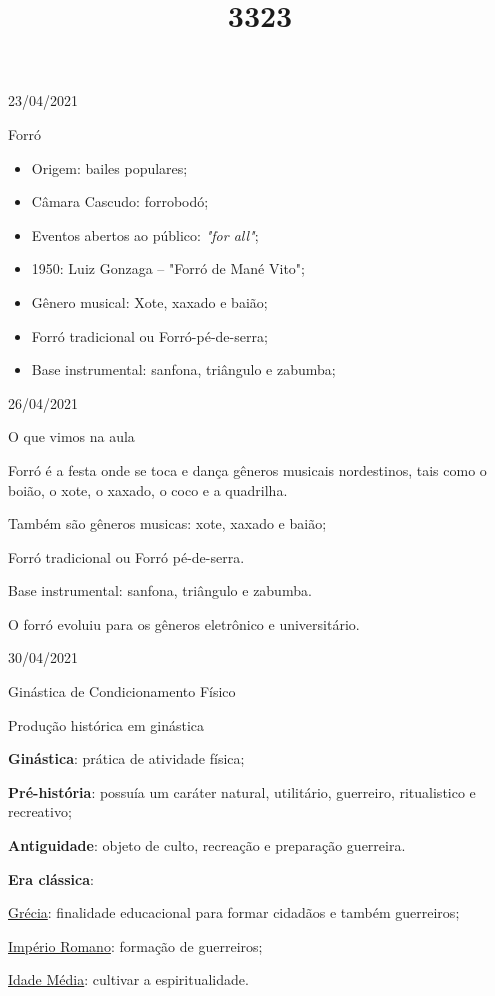 \documentclass{SchoolBook}
\begin{document}
    \begin{day}{23/04/2021}
        \title{3}{Forró}
        
        \begin{itemize}[nosep]
            \item Origem: bailes populares;
            \item Câmara Cascudo: forrobodó;
            \item Eventos abertos ao público: \emph{"for all"};
            \item 1950: Luiz Gonzaga -- "Forró de Mané Vito";
            \vspace{3pt}
            \item Gênero musical: Xote, xaxado e baião;
            \item Forró tradicional ou Forró-pé-de-serra;
            \item Base instrumental: sanfona, triângulo e zabumba;
        \end{itemize}
    \end{day}
    
    \begin{day}{26/04/2021}
        \title{3}{O que vimos na aula}
    
        Forró é a festa onde se toca e dança gêneros musicais nordestinos, tais como o boião, o xote, o xaxado, o coco e a quadrilha.
        
        Também são gêneros musicas: xote, xaxado e baião;
        
        Forró tradicional ou Forró pé-de-serra.
        
        Base instrumental: sanfona, triângulo e zabumba.
        
        O forró evoluiu para os gêneros eletrônico e universitário.
    \end{day}
    
    \begin{day}{30/04/2021}
        \title{2}{Ginástica de Condicionamento Físico}
        \title{3}{Produção histórica em ginástica}
        
        \textbf{Ginástica}: prática de atividade física;
        
        \textbf{Pré-história}: possuía um caráter natural, utilitário, guerreiro, ritualistico e recreativo;
        
        \textbf{Antiguidade}: objeto de culto, recreação e preparação guerreira.
        
        \vspace{3pt}
        
        \textbf{Era clássica}:
        
        \qquad\underline{Grécia}: finalidade educacional para formar cidadãos e também guerreiros;
        
        \qquad\underline{Império Romano}: formação de guerreiros;
        
        \qquad\underline{Idade Média}: cultivar a espiritualidade.
    \end{day}
    
\end{document}

